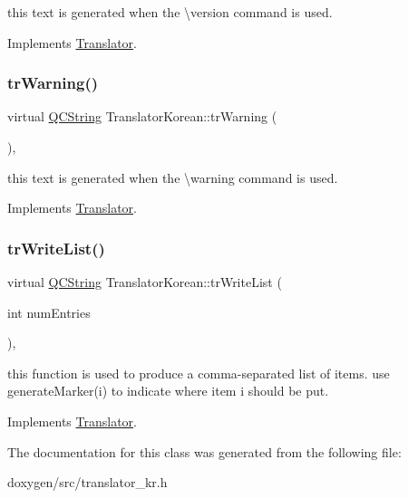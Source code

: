 this text is generated when the \textbackslash{}version command is used. 

Implements \mbox{\hyperlink{class_translator}{Translator}}.

\mbox{\label{class_translator_korean_ac143c4d603b1421e07835cd456a855e3}} 
\subsubsection{\texorpdfstring{trWarning()}{trWarning()}}
{\footnotesize\ttfamily virtual \mbox{\hyperlink{class_q_c_string}{Q\+C\+String}} Translator\+Korean\+::tr\+Warning (\begin{DoxyParamCaption}{ }\end{DoxyParamCaption})\hspace{0.3cm}{\ttfamily [inline]}, {\ttfamily [virtual]}}

this text is generated when the \textbackslash{}warning command is used. 

Implements \mbox{\hyperlink{class_translator}{Translator}}.

\mbox{\label{class_translator_korean_a702965892122f3ef3ee3145a16ce3357}} 
\subsubsection{\texorpdfstring{trWriteList()}{trWriteList()}}
{\footnotesize\ttfamily virtual \mbox{\hyperlink{class_q_c_string}{Q\+C\+String}} Translator\+Korean\+::tr\+Write\+List (\begin{DoxyParamCaption}\item[{int}]{num\+Entries }\end{DoxyParamCaption})\hspace{0.3cm}{\ttfamily [inline]}, {\ttfamily [virtual]}}

this function is used to produce a comma-\/separated list of items. use generate\+Marker(i) to indicate where item i should be put. 

Implements \mbox{\hyperlink{class_translator}{Translator}}.



The documentation for this class was generated from the following file\+:\begin{DoxyCompactItemize}
\item 
doxygen/src/translator\+\_\+kr.\+h\end{DoxyCompactItemize}
